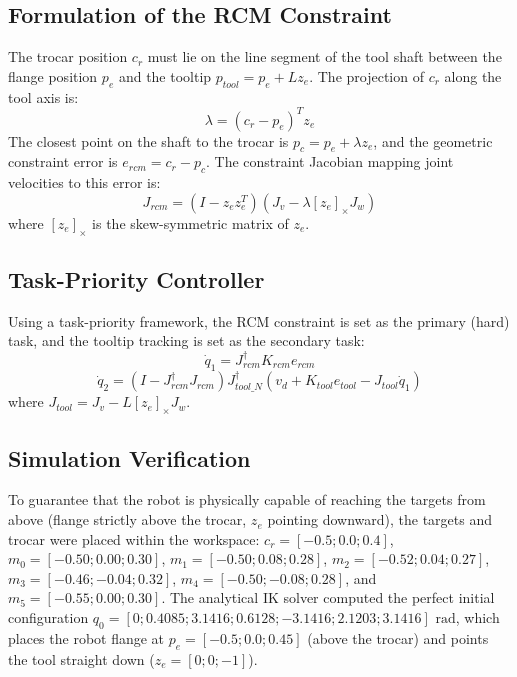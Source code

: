 \documentclass[11pt,a4paper]{article}
\begin{document}
\subsection{Formulation of the RCM Constraint}
The trocar position $c_r$ must lie on the line segment of the tool shaft between the flange position $p_e$ and the tooltip $p_{tool} = p_e + L z_e$. The projection of $c_r$ along the tool axis is:
\begin{equation}
\lambda = (c_r - p_e)^T z_e
\end{equation}
The closest point on the shaft to the trocar is $p_c = p_e + \lambda z_e$, and the geometric constraint error is $e_{rcm} = c_r - p_c$. The constraint Jacobian mapping joint velocities to this error is:
\begin{equation}
J_{rcm} = (I - z_e z_e^T) (J_v - \lambda [z_e]_{\times} J_w)
\end{equation}
where $[z_e]_{\times}$ is the skew-symmetric matrix of $z_e$.

\subsection{Task-Priority Controller}
Using a task-priority framework, the RCM constraint is set as the primary (hard) task, and the tooltip tracking is set as the secondary task:
\begin{equation}
\dot{q}_1 = J_{rcm}^{\dagger} K_{rcm} e_{rcm}
\end{equation}
\begin{equation}
\dot{q}_2 = (I - J_{rcm}^{\dagger} J_{rcm}) J_{tool\_N}^{\dagger} (v_d + K_{tool} e_{tool} - J_{tool} \dot{q}_1)
\end{equation}
where $J_{tool} = J_v - L [z_e]_{\times} J_w$.

\subsection{Simulation Verification}
To guarantee that the robot is physically capable of reaching the targets from above (flange strictly above the trocar, $z_e$ pointing downward), the targets and trocar were placed within the workspace: $c_r = [-0.5; 0.0; 0.4]$, $m_0 = [-0.50; 0.00; 0.30]$, $m_1 = [-0.50; 0.08; 0.28]$, $m_2 = [-0.52; 0.04; 0.27]$, $m_3 = [-0.46; -0.04; 0.32]$, $m_4 = [-0.50; -0.08; 0.28]$, and $m_5 = [-0.55; 0.00; 0.30]$.
The analytical IK solver computed the perfect initial configuration $q_0 = [0; 0.4085; 3.1416; 0.6128; -3.1416; 2.1203; 3.1416]\text{ rad}$, which places the robot flange at $p_e = [-0.5; 0.0; 0.45]$ (above the trocar) and points the tool straight down ($z_e = [0; 0; -1]$).
\end{document}
